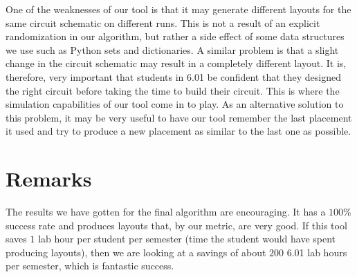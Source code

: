 One of the weaknesses of our tool is that it may generate different layouts for
the same circuit schematic on different runs.
This is not a result of an explicit randomization
in our algorithm, but rather a side effect of some data structures we use such
as Python sets and dictionaries. A similar problem is that a slight change in
the circuit schematic may result in a completely different layout. It is,
therefore, very important that students in 6.01 be confident that they designed
the right circuit before taking the time to build their circuit.
This is where the simulation
capabilities of our tool come in to play. As an alternative solution to this
problem, it may be very useful to have our
tool remember the last placement it used and try to produce a new placement as
similar to the last one as possible.

\section{Remarks}

The results we have gotten for the final algorithm are encouraging.
It has a $100\%$ success rate and produces layouts that, by our metric, are very
good. If this tool saves $1$ lab hour per student per semester (time the
student would have spent producing layouts), then we are
looking at a savings of about $200$ 6.01 lab hours per semester, which is
fantastic success.
